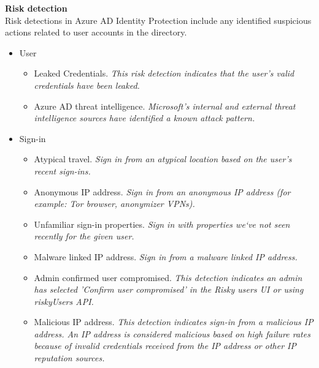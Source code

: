 \textbf{Risk detection} \\
Risk detections in Azure AD Identity Protection include any identified suspicious actions related to user accounts in the directory.
\begin{itemize}
\item User
	\begin{itemize}
	\item Leaked Credentials. \textit{This risk detection indicates that the user's valid credentials have been leaked.}
	\item Azure AD threat intelligence. \textit{Microsoft’s internal and external threat intelligence sources have identified a known attack pattern.}
	\end{itemize}
\item Sign-in
	\begin{itemize}
	\item Atypical travel. \textit{Sign in from an atypical location based on the user’s recent sign-ins.}
	\item Anonymous IP address. \textit{Sign in from an anonymous IP address (for example: Tor browser, anonymizer VPNs).}
	\item Unfamiliar sign-in properties. \textit{Sign in with properties we‘ve not seen recently for the given user.}
	\item Malware linked IP address. \textit{Sign in from a malware linked IP address.}
	\item Admin confirmed user compromised. \textit{This detection indicates an admin has selected 'Confirm user compromised' in the Risky users UI or using riskyUsers API.}
	\item Malicious IP address. \textit{This detection indicates sign-in from a malicious IP address. An IP address is considered malicious based on high failure rates because of invalid credentials received from the IP address or other IP reputation sources.}
	\end{itemize}
\end{itemize}

